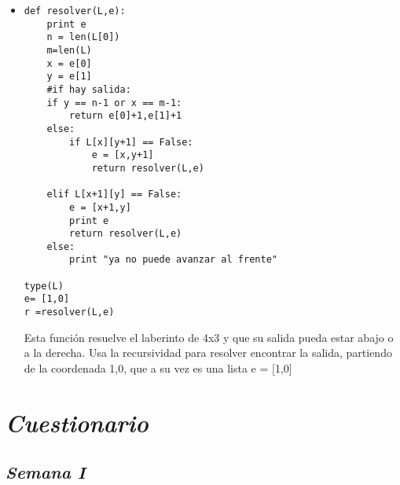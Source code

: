 \documentclass{book}
\begin{document}
\begin{enumerate}
\begin{itemize}
		\newpage
		
		\item \begin{lstlisting}
def resolver(L,e):
    print e
    n = len(L[0])
    m=len(L)
    x = e[0]
    y = e[1]
    #if hay salida:
    if y == n-1 or x == m-1:
        return e[0]+1,e[1]+1 
    else:
        if L[x][y+1] == False:
            e = [x,y+1]
            return resolver(L,e)
		
    elif L[x+1][y] == False:
        e = [x+1,y]
        print e
        return resolver(L,e)
    else:
        print "ya no puede avanzar al frente"
		
type(L)                      
e= [1,0]        
r =resolver(L,e)
		\end{lstlisting} Esta función resuelve el laberinto de 4x3 y que su salida pueda estar abajo o a la derecha. Usa la recursividad para resolver encontrar la salida, partiendo de la coordenada 1,0, que a su vez es una lista e = [1,0]
		
		
		
	\end{itemize}
	
	
	
	
	
	
	
\end{enumerate}


\chapter{\textit{Cuestionario}}
\section{\textit{Semana I}}%
\end{document}
